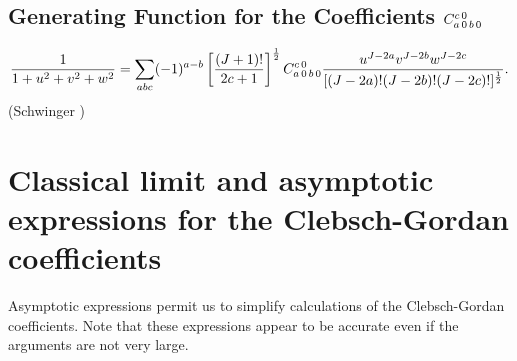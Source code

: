 \subsection{Generating Function for the Coefficients $C_{a\,0\,b\,0}^{c\,0}$}\label{sec:8.8.6}
\begin{equation}
\frac{1}{1+u^{2}+v^{2}+w^{2}}=\sum_{a b c}(-1)^{a-b}\left[\frac{(J+1)!}{2 c+1}\right]^{\frac{1}{2}} C_{a\,0\,b\,0}^{c\,0} \frac{u^{J-2 a} v^{J-2 b} w^{J-2 c}}{[(J-2 a)!(J-2 b)!(J-2 c)!]^{\frac{1}{2}}} . \label{eq:8:8:7}
\end{equation}
(Schwinger \cite{ref101})

\section[Classical limit of CG coeeficients]{Classical limit and asymptotic expressions for the Clebsch-Gordan coefficients}\label{sec:8.9}
Asymptotic expressions permit us to simplify calculations of the Clebsch-Gordan coefficients. Note that these expressions appear to be accurate even if the arguments are not very large.\\
